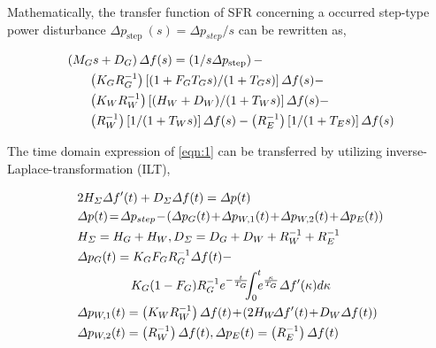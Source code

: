 \documentclass[lettersize,journal]{IEEEtran}
\begin{document}
Mathematically, the transfer function of SFR concerning a occurred step-type power disturbance $\varDelta p_{\textrm{step }}(s)=\varDelta p_{{step }} / s$ can be rewritten as,

\vspace{-0.125in}
\begin{small}
	\begin{align}\label{eqn:1}
		 & \left(M_{G} s+D_{G}\right) \varDelta f(s)=\left({1/s} \varDelta p_{ \text{step}}\right)-                                                                                                                                                          \\
		 & \qquad {\left({K_{G}}{ R_{G}^{-1}}\right)\left[ {\left(1+F_{G} T_{G} s\right)}/{\left(1+T_{G} s\right)}\right] \varDelta f(s)}- \notag                                                              \\
		 & \qquad {\left({K_W R_{W}^{-1}}\right)\left[{(H_W + D_W)}/{(1+T_{W} s)}\right] \varDelta f(s)} - \notag                                                                              \\
		 & \qquad {\left({R_{W}^{-1}}\right)\left[{1}/({1+T_{W} s})\right] \varDelta f(s)} - {\left({R_{E}^{-1}}\right)\left[{1}/({1+T_{E} s})\right] \varDelta f(s)} \notag
	\end{align}
\end{small}

The time domain expression of \eqref{eqn:1} can be transferred by utilizing inverse-Laplace-transformation (ILT),

\vspace{-0.125in}
\begin{newsubequations}\label{eqn:2}
	\begin{align}
		 & 2H_{\varSigma } \varDelta f^{\prime}(t)  +D_{\varSigma} \varDelta f(t)=\varDelta p(t)  \label{eqn:2a} \\
		 & \varDelta p(t) \! =\!\varDelta p_{step}\!-\!\left(\varDelta p_{G}(t)\!+\!\varDelta p_{W,1}(t)\!+\!\varDelta p_{W,2}(t)\!+\! \varDelta p_{E}(t)\right) \!\label{eqn:2b} \\
		 & H_{\varSigma}  =H_{G}+H_{W}, D_{\varSigma}  =D_{G}+D_{W}+{ R_{W}^{-1} } + { R_{E}^{-1}}   \label{eqn:2c}  \\
		 & \varDelta p_{G}(t)   ={K_{G} F_{G}}{ R_{G}^{-1}} \varDelta f(t)- \notag  \\
		 & \qquad\quad\quad\,\, {K_G(1-F_G)}{ R_{G}^{-1} }e^{-\frac{t}{T_G}} \!\!\!\int_{0}^{t}\!\!\! e^{\frac{\kappa}{T_G}} \varDelta f^{\prime}(\kappa) d \kappa \label{eqn:2d}  \\
		 & \varDelta p_{W,1}(t) =\left(K_{W} {R_{W}^{-1}}\right) \varDelta f(t) \!+\! \left(2H_{W}\! \varDelta f^{\prime}(t) \!+\! D_{W}\varDelta f(t)\right)\label{eqn:2e} \\
		 & \varDelta p_{W,2}(t)  =\left( { R_{W}^{-1}}\right) \varDelta f(t), \varDelta p_{E}(t)  =\left( { R_{E}^{-1}}\right) \varDelta f(t) \label{eqn:2g}
	\end{align}
\end{newsubequations}
\end{document}
